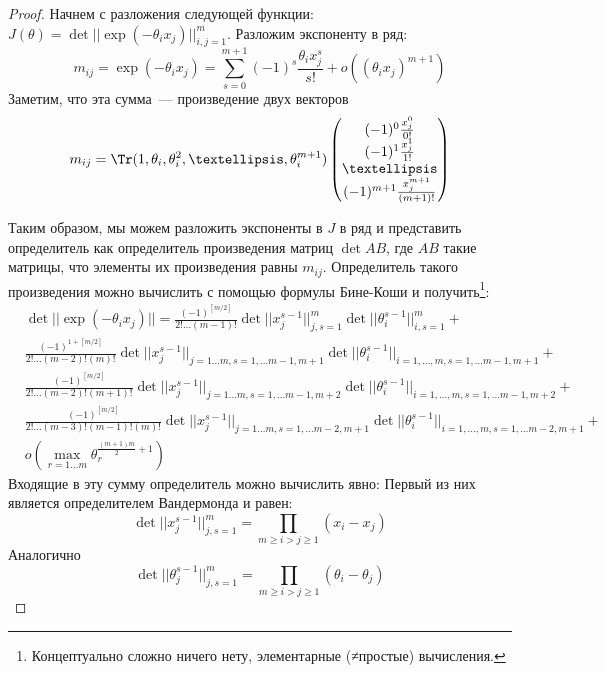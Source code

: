 \begin{proof}
Начнем с разложения следующей функции: $J(\theta) = \det || \exp(-\theta_i x_j)||_{i,j = 1}^{m}$. Разложим экспоненту в ряд:
$$ m_{ij} = \exp(-\theta_i x_j) = \sum\limits_{s=0}^{m+1} (-1)^{s}\frac{\theta_i x_j^{s}}{s!} + o((\theta_i x_j)^{m+1})$$ 
Заметим, что эта сумма — произведение двух векторов
$$m_{ij} = \Tr(1, \theta_i, \theta_i^2, …, \theta_i^{m+1}) \begin{pmatrix} (-1)^{0}\frac{x_j^0}{0!} \\ (-1)^{1}\frac{x_j^1}{1!} \\ … \\(-1)^{m+1}\frac{x_j^{m+1}}{(m+1)!} \end{pmatrix} $$

Таким образом, мы можем разложить экспоненты в $J$ в ряд и представить определитель как определитель произведения матриц $\det AB$, где $AB$ такие матрицы, что элементы их произведения равны $m_{ij}$. Определитель такого произведения можно вычислить с помощью формулы Бине-Коши и получить\footnote{Концептуально сложно ничего нету, элементарные (≠простые) вычисления.}:
\begin{equation}
\begin{split}
&\det ||\exp (-\theta_i x_j)|| = \frac{(-1)^{[m/2]} }{2!…(m-1)!}\det ||x_j^{s-1}||_{j,s = 1}^m \det ||\theta_{i}^{s-1}||_{i,s=1}^{m} + \\
& \frac{(-1)^{1+[m/2]} } {2!…(m-2)!(m)!}  \det||x_j^{s-1}||_{j=1…m, s = 1,…m-1, m+1}\det||\theta_{i}^{s-1}||_{i=1,…,m, s=1,…{m-1},m+1} + \\ 
& \frac{(-1)^{[m/2]} } {2!…(m-2)!(m+1)!}  \det||x_j^{s-1}||_{j=1…m, s = 1,…m-1, m+2}\det||\theta_{i}^{s-1}||_{i=1,…,m, s=1,…{m-1},m+2} +\\
& \frac{(-1)^{[m/2]} } {2!…(m-3)!(m-1)!(m)!}  \det||x_j^{s-1}||_{j=1…m, s = 1,…m-2, m+1}\det||\theta_{i}^{s-1}||_{i=1,…,m, s=1,…{m-2},m+1} +\\
&o\left( \max \limits_{r = 1…m}\theta_{r}^{\frac{(m+1)m}{2} + 1}\right)
\end{split}
\end{equation}
Входящие в эту сумму определитель можно вычислить явно:
Первый из них является определителем Вандермонда и равен:
$$\det ||x_j^{s-1}||_{j,s=1}^{m} = \prod \limits_{m \geq i > j \geq 1} (x_i - x_j)$$
Аналогично
$$\det ||\theta_j^{s-1}||_{j,s=1}^{m} = \prod \limits_{m \geq i > j \geq 1} (\theta_i - \theta_j)$$


\end{proof}
